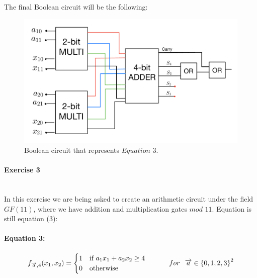 \documentclass{article}
\begin{document}
The final Boolean circuit will be the following:
\\
\begin{figure}[H]
    \centering
    \includegraphics[width=1\linewidth]{FinalBooleanCircuit.jpeg}
    \caption{Boolean circuit that represents $Equation$ $3$.}
    \label{fig:enter-label}
\end{figure}

\newpage
\paragraph{\LARGE Exercise 3\\\\}
In this exercise we are being asked to create an arithmetic circuit under the field $GF(11)$, where we have addition and multiplication gates $mod$ $11$. Equation is still equation (3):
\paragraph{Equation 3:}

$$
f_{\overrightarrow{a},4}(x_{1},x_{2})=\begin{cases}
			1 & \text{if $a_1x_1 + a_2x_2 \geq 4$ }\\
            0 & \text{otherwise}
		 \end{cases} \hspace{1cm} for \hspace{.25cm}  \overrightarrow{a} \in {\left\{ 0,1,2,3\right\}}^{2}
$$
\end{document}
